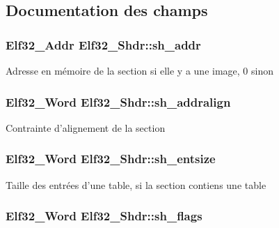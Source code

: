 \subsection{Documentation des champs}
\hypertarget{structElf32__Shdr_a7e668a62cee74a2f9c6edabb5f45635a}{
\subsubsection[{sh\+\_\+addr}]{\setlength{\rightskip}{0pt plus 5cm}Elf32\+\_\+\+Addr Elf32\+\_\+\+Shdr\+::sh\+\_\+addr}}\label{structElf32__Shdr_a7e668a62cee74a2f9c6edabb5f45635a}
Adresse en mémoire de la section si elle y a une image, 0 sinon \hypertarget{structElf32__Shdr_a399f50b3591e6286d4ad819f790979ed}{
\subsubsection[{sh\+\_\+addralign}]{\setlength{\rightskip}{0pt plus 5cm}Elf32\+\_\+\+Word Elf32\+\_\+\+Shdr\+::sh\+\_\+addralign}}\label{structElf32__Shdr_a399f50b3591e6286d4ad819f790979ed}
Contrainte d'alignement de la section \hypertarget{structElf32__Shdr_a10c59cecc928aae27930601fe545d3ca}{
\subsubsection[{sh\+\_\+entsize}]{\setlength{\rightskip}{0pt plus 5cm}Elf32\+\_\+\+Word Elf32\+\_\+\+Shdr\+::sh\+\_\+entsize}}\label{structElf32__Shdr_a10c59cecc928aae27930601fe545d3ca}
Taille des entrées d'une table, si la section contiens une table \hypertarget{structElf32__Shdr_a27e003d8da37de3038a0065577a7743d}{
\subsubsection[{sh\+\_\+flags}]{\setlength{\rightskip}{0pt plus 5cm}Elf32\+\_\+\+Word Elf32\+\_\+\+Shdr\+::sh\+\_\+flags}}\label{structElf32__Shdr_a27e003d8da37de3038a0065577a7743d}
